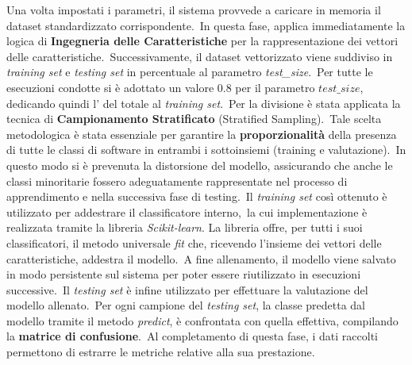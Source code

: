 \FloatBarrier

Una volta impostati i parametri, il sistema provvede a caricare in memoria il dataset standardizzato corrispondente.\
In questa fase, applica immediatamente la logica di \textbf{Ingegneria delle Caratteristiche} per la rappresentazione dei vettori delle caratteristiche.\
Successivamente, il dataset vettorizzato viene suddiviso in \textit{training set} e \textit{testing set} in percentuale al parametro \textit{test\_size}.\
Per tutte le esecuzioni condotte si è adottato un valore $0.8$ per il parametro $test\_size$, dedicando quindi
l'\percc{80} del totale al \textit{training set}.\
Per la divisione è stata applicata la tecnica di \textbf{Campionamento Stratificato} (Stratified Sampling).\
Tale scelta metodologica è stata essenziale per garantire la \textbf{proporzionalità} della presenza di tutte le classi di software in entrambi i sottoinsiemi (training e valutazione).\
In questo modo si è prevenuta la distorsione del modello, assicurando che anche le classi minoritarie fossero adeguatamente
rappresentate nel processo di apprendimento e nella successiva fase di testing.\
Il \textit{training set} così ottenuto è utilizzato per addestrare il classificatore interno,\
la cui implementazione è realizzata tramite la libreria \textit{Scikit-learn}.
La libreria offre, per tutti i suoi classificatori, il metodo universale \textit{fit} che, ricevendo l'insieme dei vettori delle caratteristiche, addestra il modello.\
A fine allenamento, il modello viene salvato in modo persistente sul sistema per poter essere riutilizzato in esecuzioni successive.\
Il \textit{testing set} è infine utilizzato per effettuare la valutazione del modello allenato.\
Per ogni campione del \textit{testing set}, la classe predetta dal modello tramite il metodo \textit{predict}, è confrontata con quella effettiva, compilando la \textbf{matrice di confusione}.\
Al completamento di questa fase, i dati raccolti permettono di estrarre le metriche relative alla sua prestazione.